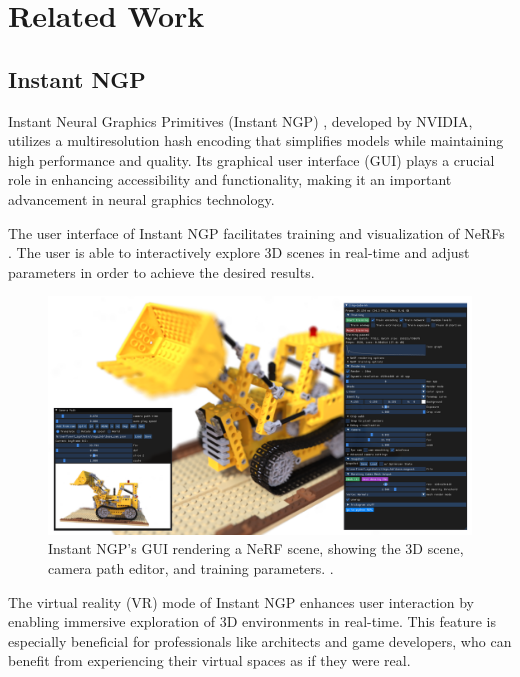 %
\chapter{Related Work}
\label{sec:related}

\section{Instant NGP}

Instant Neural Graphics Primitives (Instant NGP) \cite{muller_instant_2022}, developed by NVIDIA, utilizes a multiresolution hash encoding that simplifies models while maintaining high performance and quality.
Its graphical user interface (GUI) plays a crucial role in enhancing accessibility and functionality, making it an important advancement in neural graphics technology.

The user interface of Instant NGP facilitates training and visualization of NeRFs .
The user is able to interactively explore 3D scenes in real-time and adjust parameters in order to achieve the desired results.

\begin{figure}[h!]
  \centering
  \includegraphics[width=\textwidth]{figures/realted-instant-ngp.png}
  \caption{Instant NGP's GUI rendering a NeRF scene, showing the 3D scene, camera path editor, and training parameters.
   \cite{muller_instant_2022}.}
  \label{fig:instant-ngp}
\end{figure}

The virtual reality (VR) mode of Instant NGP enhances user interaction by enabling immersive exploration of 3D environments in real-time.
This feature is especially beneficial for professionals like architects and game developers, who can benefit from experiencing their virtual spaces as if they were real.

